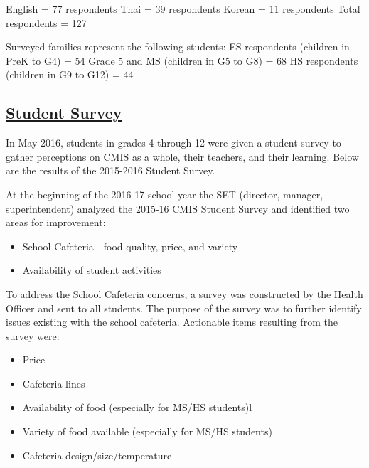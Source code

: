 {English = 77 respondents
Thai = 39 respondents
Korean = 11 respondents
Total respondents = 127

Surveyed families represent the following students: 
ES respondents (children in PreK to G4) = 54
Grade 5 and MS (children in G5 to G8) = 68
HS respondents (children in G9 to G12) = 44

}

\subsection{\href{https://docs.google.com/a/cmis.ac.th/forms/d/1n7vFCQbPQmF6pEPJKPBsu4rzdiW4KQ_DrBcjTMUbLH4/viewanalytics}{Student Survey}}

In May 2016, students in grades 4 through 12 were given a student survey to gather perceptions on CMIS as a whole, their teachers, and their learning.  Below are the results of the 2015-2016 Student Survey.  


At the beginning of the 2016-17 school year the SET (director, manager, superintendent) analyzed the 2015-16 CMIS Student Survey and identified two areas for improvement:
\begin{itemize}
\item School Cafeteria - food quality, price, and variety
\item Availability of student activities
\end{itemize}



To address the School Cafeteria concerns, a \href{https://docs.google.com/a/cmis.ac.th/forms/d/18wFe46SOpPVv9_jkKLEa4OqVsDkLtJkUCcM85Jul0Ik/viewanalytics}{survey} was constructed by the Health Officer and sent to all students. The purpose of the survey was to further identify issues existing with the school cafeteria. Actionable items resulting from the survey were: 

\begin{itemize}
\item Price 
\item Cafeteria lines
\item Availability of food (especially for MS/HS students)l
\item Variety of food available (especially for MS/HS students) 
\item Cafeteria design/size/temperature
\end{itemize}



